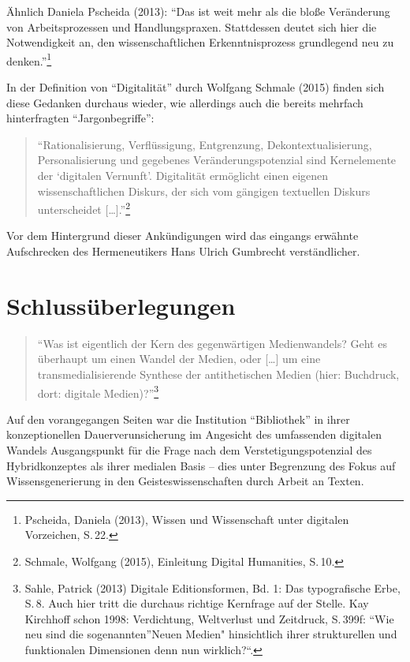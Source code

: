 \documentclass[a4paper,
fontsize=11pt,
oneside,
numbers=noperiodatend,
parskip=half-,
bibliography=totoc,
final
]{scrartcl}
\begin{document}
Ähnlich Daniela Pscheida (2013): \enquote{Das ist weit mehr als die
bloße Veränderung von Arbeitsprozessen und Handlungspraxen. Stattdessen
deutet sich hier die Notwendigkeit an, den wissenschaftlichen
Erkenntnisprozess grundlegend neu zu denken.}\footnote{Pscheida, Daniela
  (2013), Wissen und Wissenschaft unter digitalen Vorzeichen, S.\,22.}

In der Definition von \enquote{Digitalität} durch Wolfgang Schmale
(2015) finden sich diese Gedanken durchaus wieder, wie allerdings auch
die bereits mehrfach hinterfragten \enquote{Jargonbegriffe}:

\begin{quote}
\enquote{Rationalisierung, Verflüssigung, Entgrenzung,
Dekontextualisierung, Personalisierung und gegebenes
Veränderungspotenzial sind Kernelemente der \enquote{digitalen
Vernunft}. Digitalität ermöglicht einen eigenen wissenschaftlichen
Diskurs, der sich vom gängigen textuellen Diskurs unterscheidet
{[}\ldots{}{]}.}\footnote{Schmale, Wolfgang (2015), Einleitung Digital
  Humanities, S.\,10.}
\end{quote}

Vor dem Hintergrund dieser Ankündigungen wird das eingangs erwähnte
Aufschrecken des Hermeneutikers Hans Ulrich Gumbrecht verständlicher.

\section*{Schlussüberlegungen}\label{schlussuxfcberlegungen}

\begin{quote}
\enquote{Was ist eigentlich der Kern des gegenwärtigen Medienwandels?
Geht es überhaupt um einen Wandel der Medien, oder {[}\ldots{}{]} um
eine transmedialisierende Synthese der antithetischen Medien (hier:
Buchdruck, dort: digitale Medien)?}\footnote{Sahle, Patrick (2013)
  Digitale Editionsformen, Bd. 1: Das typografische Erbe, S.\,8. Auch
  hier tritt die durchaus richtige Kernfrage auf der Stelle. Kay
  Kirchhoff schon 1998: Verdichtung, Weltverlust und Zeitdruck, S.\,399f:
  \enquote{Wie neu sind die sogenannten}Neuen Medien" hinsichtlich ihrer
  strukturellen und funktionalen Dimensionen denn nun wirklich?``.}
\end{quote}

Auf den vorangegangen Seiten war die Institution \enquote{Bibliothek} in
ihrer konzeptionellen Dauerverunsicherung im Angesicht des umfassenden
digitalen Wandels Ausgangspunkt für die Frage nach dem
Verstetigungspotenzial des Hybridkonzeptes als ihrer medialen Basis --
dies unter Begrenzung des Fokus auf Wissensgenerierung in den
Geisteswissenschaften durch Arbeit an Texten.
\end{document}
